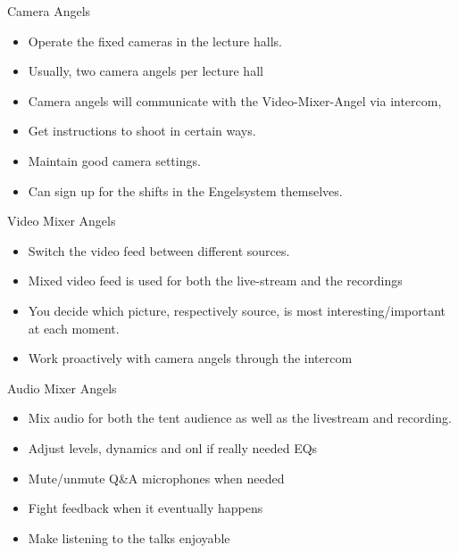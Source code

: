 \documentclass[aspectratio=169]{beamer}
\begin{document}
\begin{frame}{Camera Angels}
	\begin{itemize}
		\item Operate the fixed cameras in the lecture halls. 
		\item Usually, two camera angels per lecture hall 
		\item Camera angels will communicate with the Video-Mixer-Angel via intercom,
		\item Get instructions to shoot in certain ways. 
		\item Maintain good camera settings.
		\item Can sign up for the shifts in the Engelsystem themselves.
	\end{itemize}
\end{frame}

\begin{frame}{Video Mixer Angels}
	\begin{itemize}
		\item Switch the video feed between different sources. 
		\item Mixed video feed is used for both the live-stream and the recordings 
		\item You decide which picture, respectively source, is most interesting/important at each moment.
		\item Work proactively with camera angels through the intercom
	\end{itemize}
\end{frame}


\begin{frame}{Audio Mixer Angels}
	\begin{itemize}
		\item Mix audio for both the tent audience as well as the livestream and recording.
        \item Adjust levels, dynamics and onl if really needed EQs
        \item Mute/unmute Q\&A microphones when needed
        \item Fight feedback when it eventually happens
        \item Make listening to the talks enjoyable
	\end{itemize}
\end{frame}
\end{document}
